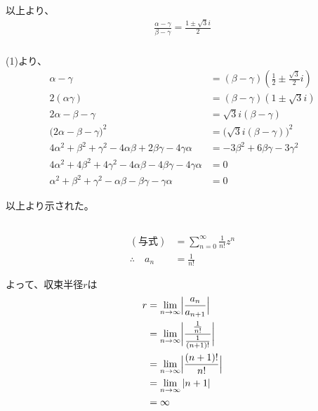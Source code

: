 \documentclass[dvipdfmx,a4paper]{jsarticle}
\begin{document}
以上より、
\begin{align*}
\frac{\alpha-\gamma}{\beta-\gamma} = \frac{1\pm\sqrt{3}i}{2}
\end{align*}

\subsubsection{}

(1)より、
\begin{align*}
\alpha-\gamma &= (\beta-\gamma)(\frac{1}{2} \pm \frac{\sqrt{3}}{2}i)\\
2(\alpha\gamma) &= (\beta-\gamma)(1\pm\sqrt{3}i)\\
2\alpha - \beta - \gamma &= \sqrt{3}i(\beta - \gamma)\\
\bigl(2\alpha - \beta - \gamma\bigr)^2 &= \bigl(\sqrt{3}i(\beta - \gamma)\bigr)^2\\
4\alpha^2 + \beta^2 + \gamma^2 - 4\alpha\beta + 2\beta\gamma - 4\gamma\alpha &= -3\beta^2 +6\beta\gamma -3\gamma^2\\
4\alpha^2 + 4\beta^2 + 4\gamma^2 - 4\alpha\beta - 4\beta\gamma - 4\gamma\alpha &= 0\\
\alpha^2 + \beta^2 + \gamma^2 - \alpha\beta -\beta\gamma -\gamma\alpha &= 0
\end{align*}

以上より示された。


\subsection{}

\subsubsection{}
\begin{align*}
(与式) &= \sum_{n=0}^{\infty}\frac{1}{n!}z^n\\
\therefore\quad
a_n &= \frac{1}{n!}
\end{align*}

よって、収束半径$r$は
\begin{align*}
r &= \lim_{n \to \infty}\Bigl|\frac{a_n}{a_{n+1}}\Bigr|\\
&= \lim_{n \to \infty}\biggl|\frac{\frac{1}{n!}}{\frac{1}{(n+1)!}}\biggr|\\
&= \lim_{n \to \infty}\Bigl|\frac{(n+1)!}{n!}\Bigr|\\
&= \lim_{n\to \infty}|n+1|\\
&= \infty
\end{align*}
\end{document}
